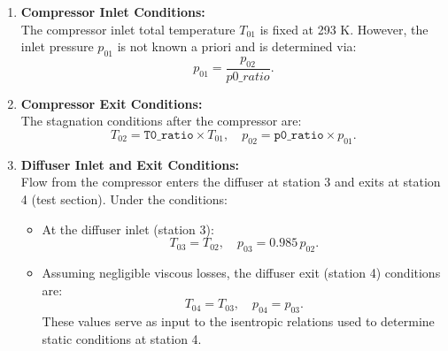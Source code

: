 \documentclass[12pt]{article}
\begin{document}
\begin{enumerate}
    \item \textbf{ Compressor Inlet Conditions:} \\
    The compressor inlet total temperature \(T_{01}\) is fixed at 293 K. However, the inlet pressure \(p_{01}\) is not known a priori and is determined via:
    \[
    p_{01} = \frac{p_{02}}{p0\_ratio}.
    \]

    \item \textbf{Compressor Exit Conditions:} \\
    The stagnation conditions after the compressor are:
    \[
    T_{02} = \texttt{T0\_ratio} \times T_{01}, \quad p_{02} = \texttt{p0\_ratio} \times p_{01}.
    \]

    \item \textbf{Diffuser Inlet and Exit Conditions:} \\
    Flow from the compressor enters the diffuser at station 3 and exits at station 4 (test section). Under the conditions:
    \begin{itemize}
        \item At the diffuser inlet (station 3):
        \[
        T_{03} = T_{02}, \quad p_{03} = 0.985\,p_{02}.
        \]
        \item Assuming negligible viscous losses, the diffuser exit (station 4) conditions are:
        \[
        T_{04} = T_{03}, \quad p_{04} = p_{03}.
        \]
        These values serve as input to the isentropic relations used to determine static conditions at station 4.
    \end{itemize}
 

\end{enumerate}
\end{document}
